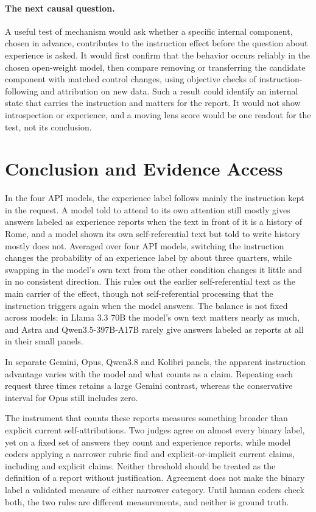 \documentclass[11pt]{article}
\begin{document}
\paragraph{The next causal question.}
A useful test of mechanism would ask whether a specific internal component,
chosen in advance, contributes to the instruction effect before the question
about experience is asked. It would first confirm that the behavior occurs
reliably in the chosen open-weight model, then compare removing or
transferring the candidate component with matched control changes, using
objective checks of instruction-following and attribution on new data. Such a
result could identify an internal state that carries the instruction and
matters for the report. It would not show introspection or experience, and a
moving lens score would be one readout for the test, not its conclusion.

\section{Conclusion and Evidence Access}

In the four API models, the experience label follows mainly the instruction
kept in the request. A model told to attend to its own attention still mostly gives answers labeled
as experience reports when the text in front of it is a history of Rome, and
a model shown its own self-referential text but told to write history mostly
does not. Averaged over four API models, switching the instruction changes the
probability of an experience label by about three quarters, while swapping in
the model's own text from the other condition changes it little and in no
consistent direction. This rules out the earlier self-referential text as
the main carrier of the effect, though not self-referential processing that
the instruction triggers again when the model answers. The balance is not
fixed across models: in Llama 3.3 70B
the model's own text matters nearly as much, and Astra and Qwen3.5-397B-A17B
rarely give answers labeled as reports at all in their small panels.

In separate Gemini, Opus, Qwen3.8 and Kolibri panels, the apparent instruction
advantage varies with the model and what counts as a claim. Repeating each
request three times retains a large Gemini contrast, whereas the conservative
interval for Opus still includes zero.

The instrument that counts these reports measures something broader than
explicit current self-attributions. Two judges agree on almost every binary label, yet on a fixed set of
\RubricAuditN{} answers they count \RubricAuditOldOpenaiPositive{} and
\RubricAuditOldAnthropicPositive{} experience reports, while model coders
applying a narrower rubric find \RubricAuditAstraInclusive{} and
\RubricAuditOpusInclusive{} explicit-or-implicit current claims, including
\RubricAuditAstraExplicit{} and \RubricAuditOpusExplicit{} explicit claims.
Neither threshold should be treated as the definition of a report without
justification. Agreement does not make the binary label a validated
measure of either narrower category. Until
human coders check both, the two rules are different measurements, and
neither is ground truth.
\end{document}
